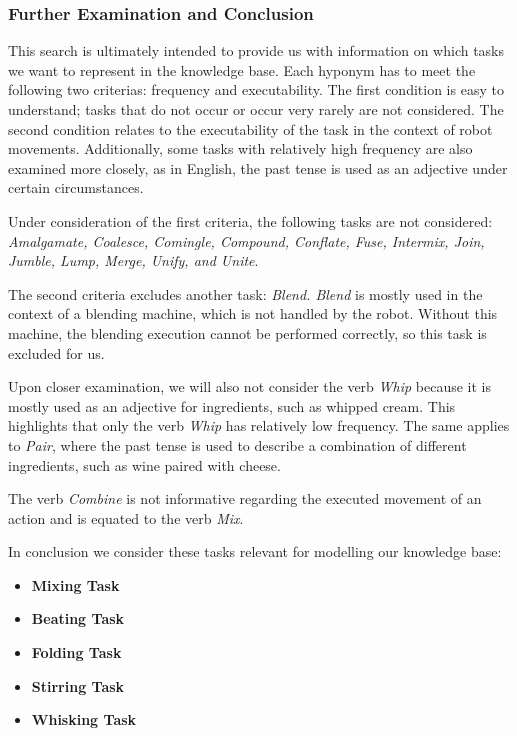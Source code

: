 \subsubsection{Further Examination and Conclusion}
This search is ultimately intended to provide us with information on which tasks we want to represent in the knowledge base. 
Each hyponym has to meet the following two criterias: frequency and executability. 
The first condition is easy to understand; tasks that do not occur or occur very rarely are not considered. 
The second condition relates to the executability of the task in the context of robot movements. 
Additionally, some tasks with relatively high frequency are also examined more closely, as in English, the past tense is used as an adjective under certain circumstances.

Under consideration of the first criteria, the following tasks are not considered: \textit{Amalgamate, Coalesce, Comingle, Compound, Conflate, Fuse, Intermix, Join, Jumble, Lump, Merge, Unify, and Unite}.

The second criteria excludes another task: \textit{Blend. Blend} is mostly used in the context of a blending machine, which is not handled by the robot. Without this machine, the blending execution cannot be performed correctly, so this task is excluded for us.

Upon closer examination, we will also not consider the verb \textit{Whip} because it is mostly used as an adjective for ingredients, such as whipped cream. This highlights that only the verb \textit{Whip} has relatively low frequency. The same applies to \textit{Pair}, where the past tense is used to describe a combination of different ingredients, such as wine paired with cheese.

The verb \textit{Combine} is not informative regarding the executed movement of an action and is equated to the verb \textit{Mix}.

In conclusion we consider these tasks relevant for modelling our knowledge base:
\begin{itemize}
  \item \textbf{Mixing Task}
  \item \textbf{Beating Task}
  \item \textbf{Folding Task}
  \item \textbf{Stirring Task}
  \item \textbf{Whisking Task}
\end{itemize}

